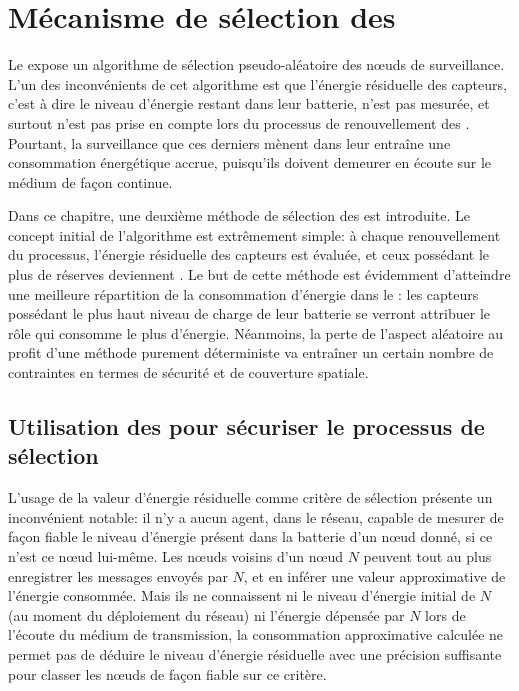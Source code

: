 \section{Mécanisme de sélection des \cns}\label{se:sec:proposal}

Le  expose un algorithme de sélection pseudo-aléatoire des nœuds de surveillance.
L'un des inconvénients de cet algorithme est que l'énergie résiduelle des capteurs, c'est à dire le niveau d'énergie restant dans leur batterie, n'est pas mesurée, et surtout n'est pas prise en compte lors du processus de renouvellement des \cns.
Pourtant, la surveillance que ces derniers mènent dans leur \cluster entraîne une consommation énergétique accrue, puisqu'ils doivent demeurer en écoute sur le médium de façon continue.

Dans ce chapitre, une deuxième méthode de sélection des \cns est introduite.
Le concept initial de l'algorithme est extrêmement simple: à chaque renouvellement du processus, l'énergie résiduelle des capteurs est évaluée, et ceux possédant le plus de réserves deviennent \cns.
Le but de cette méthode est évidemment d'atteindre une meilleure répartition de la consommation d'énergie dans le \cluster: les capteurs possédant le plus haut niveau de charge de leur batterie se verront attribuer le rôle qui consomme le plus d'énergie.
Néanmoins, la perte de l'aspect aléatoire au profit d'une méthode purement déterministe va entraîner un certain nombre de contraintes en termes de sécurité et de couverture spatiale.

    \subsection{Utilisation des \vns pour sécuriser le processus de sélection}\label{se:subsubsec:elec1}

L'usage de la valeur d'énergie résiduelle comme critère de sélection présente un inconvénient notable: il n'y a aucun agent, dans le réseau, capable de mesurer de façon fiable le niveau d'énergie présent dans la batterie d'un nœud donné, si ce n'est ce nœud lui-même.
Les nœuds voisins d'un nœud $N$ peuvent tout au plus enregistrer les messages envoyés par $N$, et en inférer une valeur approximative de l'énergie consommée.
Mais ils ne connaissent ni le niveau d'énergie initial de $N$ (au moment du déploiement du réseau) ni l'énergie dépensée par $N$ lors de l'écoute du médium de transmission, la consommation approximative calculée ne permet pas de déduire le niveau d'énergie résiduelle avec une précision suffisante pour classer les nœuds de façon fiable sur ce critère.

